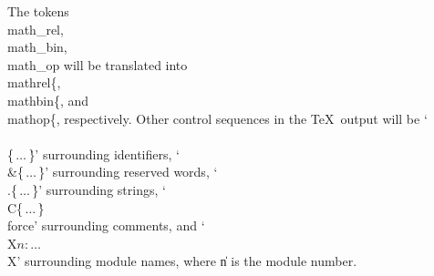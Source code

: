 The tokens \\{math\_rel}, \\{math\_bin}, \\{math\_op} will be translated into
\.{\\mathrel\{}, \.{\\mathbin\{}, and \.{\\mathop\{}, respectively.
Other control sequences in the \TeX\ output will be `\.{\\\\\{}$\,\ldots\,$\.%
\}'
surrounding identifiers, `\.{\\\&\{}$\,\ldots\,$\.\}' surrounding
reserved words, `\.{\\.\{}$\,\ldots\,$\.\}' surrounding strings,
`\.{\\C\{}$\,\ldots\,$\.\}$\,$\\{force}' surrounding comments, and
`\.{\\X$n$:}$\,\ldots\,$\.{\\X}' surrounding module names, where
\|n is the module number.

